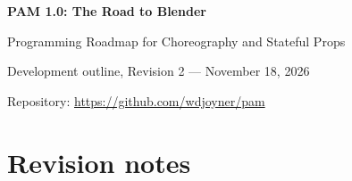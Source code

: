 \documentclass[12pt,letterpaper]{article}
\begin{document}
\begin{center}
{\huge\bfseries PAM 1.0: The Road to Blender}\par
\vspace{0.5em}
{\Large Programming Roadmap for Choreography and Stateful Props}\par
\vspace{0.7em}
{\normalsize Development outline, Revision 2 --- November 18, 2026}\par
\vspace{0.3em}
{\small Repository: \url{https://github.com/wdjoyner/pam}}\par
\end{center}
\vspace{0.5em}

\begin{abstract}
The objective is to extend Pose And Motion (PAM) into a screenplay-driven animation engine capable of producing a \emph{complete, carefully timed Manim performance} that can later be rendered in Blender without changing the choreography. The plan consists of nine incremental milestones, with \emph{Abraham and Isaac, Revisited} (Draft 2) as the principal integration test. Its emphasis is on dependable choreography, interaction constraints, composite prop state, reproducible timing, and trace fidelity---before Blender cosmetics. Revision 2 fixes the frame clock at 15 frames per second, carries the first vertical slice all the way to Blender, commits to an analytic two-bone solver for contact constraints, and brings the proposed syntax in line with existing PAM conventions.
\end{abstract}

\tableofcontents
\clearpage

\section*{Revision notes}
\end{document}
